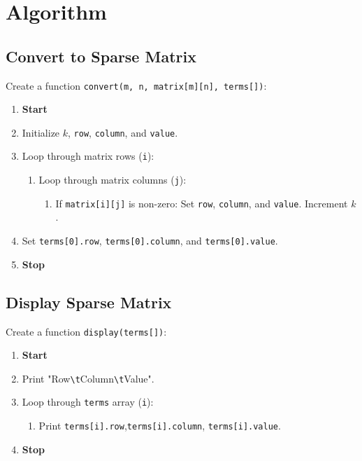 
\section{Algorithm}
\subsection{Convert to Sparse Matrix}
Create a function \texttt{convert(m, n, matrix[m][n], terms[])}:
\begin{enumerate}
  \item \textbf{Start}
  \item Initialize $k$, \texttt{row}, \texttt{column}, and \texttt{value}.
  \item Loop through matrix rows (\texttt{i}):
        \begin{enumerate}[label=2.\arabic*:]
          \item Loop through matrix columns (\texttt{j}):
                \begin{enumerate}[label=2.1.\arabic*:]
                  \item If \texttt{matrix[i][j]} is non-zero:
                        Set \texttt{row}, \texttt{column}, and \texttt{value}.
                        Increment $k$.
                \end{enumerate}
        \end{enumerate}
  \item Set \texttt{terms[0].row}, \texttt{terms[0].column}, and \texttt{terms[0].value}.
  \item \textbf{Stop}
\end{enumerate}

\subsection{Display Sparse Matrix}
Create a function \texttt{display(terms[])}:
\begin{enumerate}
  \item \textbf{Start}
  \item Print "Row\texttt{\textbackslash t}Column\texttt{\textbackslash t}Value".
  \item Loop through \texttt{terms} array (\texttt{i}):
        \begin{enumerate}[label=3.\arabic*:]
          \item Print \texttt{terms[i].row},\texttt{terms[i].column}, \texttt{terms[i].value}.
        \end{enumerate}
  \item \textbf{Stop}
\end{enumerate}

